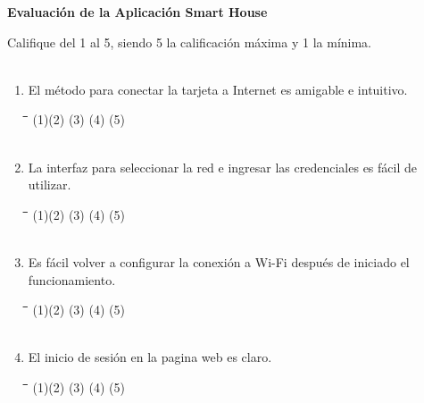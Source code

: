 \documentclass[]{proc}
\begin{document}
	
\textbf{Evaluación de la Aplicación Smart House\\}

Califique del 1 al 5, siendo 5 la calificación máxima y 1 la mínima.\\\\

\begin{enumerate}
	\item El método para conectar la tarjeta a Internet es amigable e intuitivo.
	
	\begin{tabbing}
		\hspace{1cm}\=\hspace{1cm}\=\hspace{1cm}\=\hspace{1cm}\=\kill
		(1)\>(2)  \>(3)  \>(4)  \>(5)\\\\
	\end{tabbing}
	
	\item La interfaz para seleccionar la red e ingresar las credenciales es fácil de utilizar. 
	
	\begin{tabbing}
		\hspace{1cm}\=\hspace{1cm}\=\hspace{1cm}\=\hspace{1cm}\=\kill
		(1)\>(2)  \>(3)  \>(4)  \>(5) \\\\
	\end{tabbing} 
	
	\item Es fácil volver a configurar la conexión a Wi-Fi después de iniciado el funcionamiento.
	
	\begin{tabbing}
		\hspace{1cm}\=\hspace{1cm}\=\hspace{1cm}\=\hspace{1cm}\=\kill
		(1)\>(2)  \>(3)  \>(4)  \>(5) \\\\
	\end{tabbing} 
	
	\item El inicio de sesión en la pagina web es claro.
	
	\begin{tabbing}
		\hspace{1cm}\=\hspace{1cm}\=\hspace{1cm}\=\hspace{1cm}\=\kill
		(1)\>(2)  \>(3)  \>(4)  \>(5) \\\\
	\end{tabbing} 
	

\end{enumerate}
\end{document}

